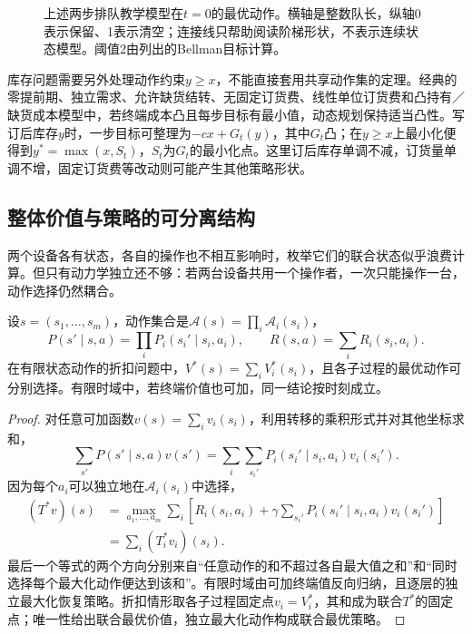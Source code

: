 \begin{figure}[htbp]
 \centering
 
 \caption{上述两步排队教学模型在$t=0$的最优动作。横轴是整数队长，纵轴0表示保留、1表示清空；连接线只帮助阅读阶梯形状，不表示连续状态模型。阈值2由列出的Bellman目标计算。}
 \label{fig:rl-planning-threshold}
\end{figure}

库存问题需要另外处理动作约束$y\geq x$，不能直接套用共享动作集的定理。经典的零提前期、独立需求、允许缺货结转、无固定订货费、线性单位订货费和凸持有／缺货成本模型中，若终端成本凸且每步目标有最小值，动态规划保持适当凸性。写订后库存$y$时，一步目标可整理为$-cx+G_t(y)$，其中$G_t$凸；在$y\geq x$上最小化便得到$y^*=\max(x,S_t)$，$S_t$为$G_t$的最小化点。这里订后库存单调不减，订货量单调不增，固定订货费等改动则可能产生其他策略形状。

\subsection{整体价值与策略的可分离结构}
\label{sec:rl-planning-separable}

两个设备各有状态，各自的操作也不相互影响时，枚举它们的联合状态似乎浪费计算。但只有动力学独立还不够：若两台设备共用一个操作者，一次只能操作一台，动作选择仍然耦合。

\begin{theorem}[独立子过程的可分离性]
 \label{thm:rl-planning-separable}
 设$s=(s_1,\ldots,s_m)$，动作集合是$\mathcal A(s)=\prod_i\mathcal A_i(s_i)$，
 \[
 P(s'\mid s,a)=\prod_iP_i(s_i'\mid s_i,a_i),\qquad
 R(s,a)=\sum_iR_i(s_i,a_i).
 \]
 在有限状态动作的折扣问题中，$V^*(s)=\sum_iV_i^*(s_i)$，且各子过程的最优动作可分别选择。有限时域中，若终端价值也可加，同一结论按时刻成立。
\end{theorem}
\begin{proof}
 对任意可加函数$v(s)=\sum_i v_i(s_i)$，利用转移的乘积形式并对其他坐标求和，
 \[
 \sum_{s'}P(s'\mid s,a)v(s')
 =\sum_i\sum_{s_i'}P_i(s_i'\mid s_i,a_i)v_i(s_i').
 \]
 因为每个$a_i$可以独立地在$\mathcal A_i(s_i)$中选择，
 \[
 \begin{aligned}
 (T^*v)(s)
 &=\max_{a_1,\ldots,a_m}\sum_i
   \left[R_i(s_i,a_i)+\gamma\sum_{s_i'}P_i(s_i'\mid s_i,a_i)v_i(s_i')\right]\\
 &=\sum_i(T_i^*v_i)(s_i).
 \end{aligned}
 \]
 最后一个等式的两个方向分别来自“任意动作的和不超过各自最大值之和”和“同时选择每个最大化动作便达到该和”。有限时域由可加终端值反向归纳，且逐层的独立最大化恢复策略。折扣情形取各子过程固定点$v_i=V_i^*$，其和成为联合$T^*$的固定点；唯一性给出联合最优价值，独立最大化动作构成联合最优策略。
\end{proof}

